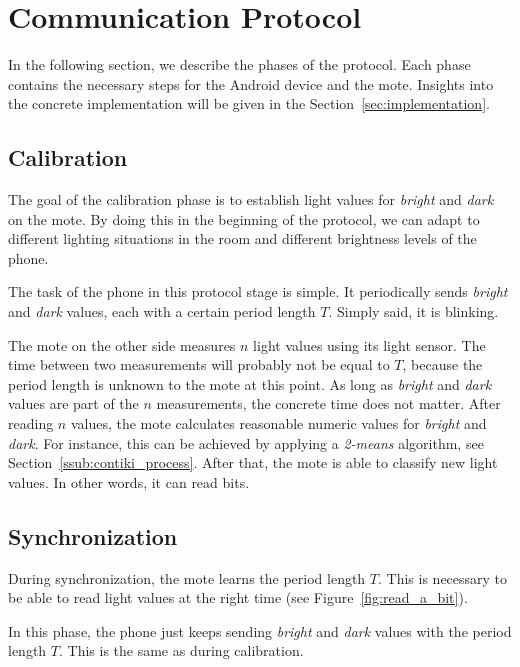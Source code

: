 \documentclass{sig-alternate} %
\begin{document}
\section{Communication Protocol}
\label{sec:communication_protocol}

In the following section, we describe the phases of the protocol.
Each phase contains the necessary steps for the Android device and the mote.
Insights into the concrete implementation will be given in the Section~\ref{sec:implementation}.

\subsection{Calibration}
\label{sub:calibration}

The goal of the calibration phase is to establish light values for \textit{bright} and \textit{dark} on the mote.
By doing this in the beginning of the protocol, we can adapt to different lighting situations in the room and different brightness levels of the phone.

The task of the phone in this protocol stage is simple.
It periodically sends \textit{bright} and \textit{dark} values, each with a certain period length $T$.
Simply said, it is blinking.

The mote on the other side measures $n$ light values using its light sensor.
The time between two measurements will probably not be equal to $T$, because the period length is unknown to the mote at this point.
As long as \textit{bright} and \textit{dark} values are part of the $n$ measurements, the concrete time does not matter.
After reading $n$ values, the mote calculates reasonable numeric values for \textit{bright} and \textit{dark}.
For instance, this can be achieved by applying a \mbox{\textit{2-means}} algorithm, see Section~\ref{ssub:contiki_process}.
After that, the mote is able to classify new light values.
In other words, it can read bits.

\subsection{Synchronization}
\label{sub:synchronization}

During synchronization, the mote learns the period length $T$.
This is necessary to be able to read light values at the right time (see Figure~\ref{fig:read_a_bit}).

In this phase, the phone just keeps sending \textit{bright} and \textit{dark} values with the period length $T$.
This is the same as during calibration.
\end{document}
